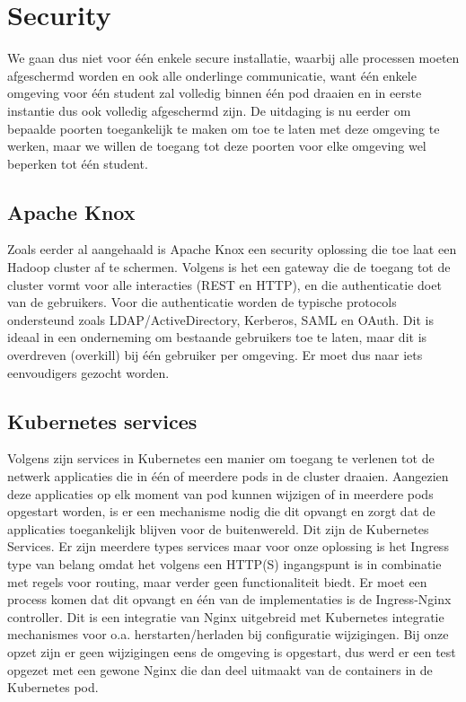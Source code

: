\section{Security}
We gaan dus niet voor \'e\'en enkele secure installatie, waarbij alle processen moeten afgeschermd worden en ook alle onderlinge communicatie, want \'e\'en enkele omgeving voor \'e\'en student zal volledig binnen \'e\'en pod draaien en in eerste instantie dus ook volledig afgeschermd zijn.
De uitdaging is nu eerder om bepaalde poorten toegankelijk te maken om toe te laten met deze omgeving te werken, maar we willen de toegang tot deze poorten voor elke omgeving wel beperken tot \'e\'en student.

\subsection{Apache Knox}
Zoals eerder al aangehaald is Apache Knox een security oplossing die toe laat een Hadoop cluster af te schermen.
Volgens \textcite{Knox2023} is het een gateway die de toegang tot de cluster vormt voor alle interacties (REST en HTTP), en die authenticatie doet van de gebruikers. Voor die authenticatie worden de typische protocols ondersteund zoals LDAP/ActiveDirectory, Kerberos, SAML en OAuth. Dit is ideaal in een onderneming om bestaande gebruikers toe te laten, maar dit is overdreven (overkill) bij \'e\'en gebruiker per omgeving. Er moet dus naar iets eenvoudigers gezocht worden.

\subsection{Kubernetes services}
Volgens \textcite{Kubernetes2023b} zijn services in Kubernetes een manier om toegang te verlenen tot de netwerk applicaties die in één of meerdere pods in de cluster draaien.
\newline
Aangezien deze applicaties op elk moment van pod kunnen wijzigen of in meerdere pods opgestart worden, is er een mechanisme nodig die dit opvangt en zorgt dat de applicaties toegankelijk blijven voor de buitenwereld. Dit zijn de Kubernetes Services.
\newline
Er zijn meerdere types services maar voor onze oplossing is het Ingress type van belang omdat het volgens \autocite{Kubernetes2023d} een HTTP(S) ingangspunt is in combinatie met regels voor routing, maar verder geen functionaliteit biedt. Er moet een process komen dat dit opvangt en \'e\'en van de implementaties is de Ingress-Nginx controller. Dit is een integratie van Nginx uitgebreid met Kubernetes integratie mechanismes voor o.a. herstarten/herladen bij configuratie wijzigingen. Bij onze opzet zijn er geen wijzigingen eens de omgeving is opgestart, dus werd er een test opgezet met een gewone Nginx die dan deel uitmaakt van de containers in de Kubernetes pod.

